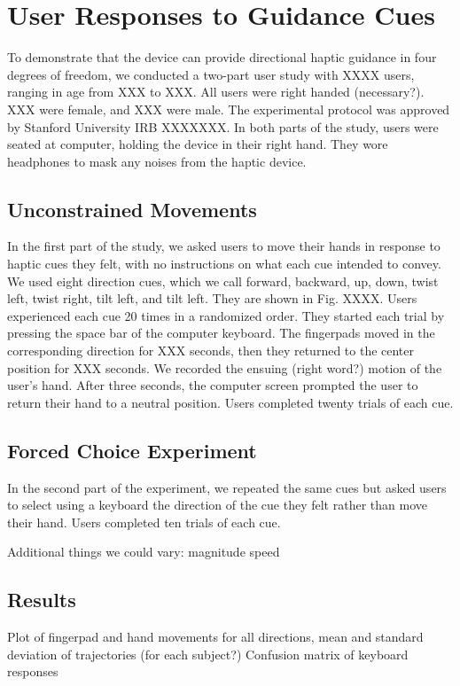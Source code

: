 \section{User Responses to Guidance Cues}
To demonstrate that the device can provide directional haptic guidance in four degrees of freedom, we conducted a two-part user study with XXXX users, ranging in age from XXX to XXX. All users were right handed (necessary?). XXX were female, and XXX were male. The experimental protocol was approved by Stanford University IRB XXXXXXX. In both parts of the study, users were seated at computer, holding the device in their right hand. They wore headphones to mask any noises from the haptic device.

\subsection{Unconstrained Movements}
In the first part of the study, we asked users to move their hands in response to haptic cues they felt, with no instructions on what each cue intended to convey. We used eight direction cues, which we call forward, backward, up, down, twist left, twist right, tilt left, and tilt left. They are shown in Fig. XXXX. Users experienced each cue 20 times in a randomized order. They started each trial by pressing the space bar of the computer keyboard. The fingerpads moved in the corresponding direction for XXX seconds, then they returned to the center position for XXX seconds. We recorded the ensuing (right word?) motion of the user's hand.
After three seconds, the computer screen prompted the user to return their hand to a neutral position. Users completed twenty trials of each cue.

\subsection{Forced Choice Experiment}
In the second part of the experiment, we repeated the same cues but asked users to select using a keyboard the direction of the cue they felt rather than move their hand. Users completed ten trials of each cue. 


\begin{outline}
\1 Additional things we could vary: 
	\2 magnitude
	\2 speed
\end{outline}

\subsection{Results}
\begin{outline}
\1 Plot of fingerpad and hand movements for all directions, mean and standard deviation of trajectories (for each subject?)
\1 Confusion matrix of keyboard responses
\end{outline}



